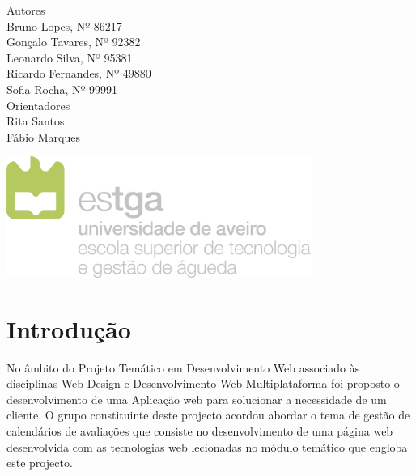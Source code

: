 \documentclass[11pt, twoside]{report}
\begin{document}
\begin{titlepage}
		
		
		\large
		Autores\\
		Bruno Lopes, Nº 86217 \\
		Gonçalo Tavares, Nº 92382  \\
		Leonardo Silva, Nº 95381 \\
		Ricardo Fernandes, Nº 49880  \\
		Sofia Rocha, Nº 99991 \\
		
		\vspace{1cm}
		Orientadores\\
		Rita Santos \\
		Fábio Marques\\
		\vspace{4cm}
		
		\centering
		\includegraphics[width=10cm]{image/AssB_vertical_cor}
		
	\end{titlepage}

	\newpage
	\setcounter{page}{1} %
	\tableofcontents %
	\thispagestyle{plain} %
	\thispagestyle{empty} %
	\newpage
	\listoftables %
	\newpage
	\listoffigures %
	
	\newpage
	
	\chapter{Introdução}
	
	No âmbito do Projeto Temático em Desenvolvimento Web associado às disciplinas Web Design e Desenvolvimento Web Multiplataforma foi proposto o desenvolvimento de uma Aplicação web para solucionar a necessidade de um cliente. 
	O grupo constituinte deste projecto acordou abordar o tema de gestão de calendários de avaliações que consiste no desenvolvimento de uma página web desenvolvida com as tecnologias web lecionadas no módulo temático que engloba este projecto. 
	
\end{document}
